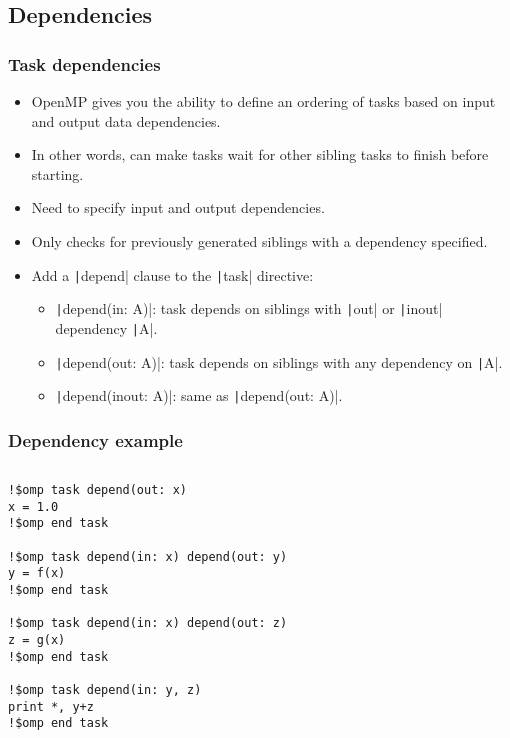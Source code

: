 \documentclass{beamer}
\begin{document}
\subsection{Dependencies}
\begin{frame}
\frametitle{Task dependencies}
\begin{itemize}
  \item OpenMP gives you the ability to define an ordering of tasks based on input and output data dependencies.
  \item In other words, can make tasks wait for other sibling tasks to finish before starting.
  \item Need to specify input and output dependencies.
  \item Only checks for previously generated siblings with a dependency specified.
  \item Add a \texttt|depend| clause to the \texttt|task| directive:
  \begin{itemize}
    \item \texttt|depend(in: A)|: task depends on siblings with \texttt|out| or \texttt|inout| dependency \texttt|A|.
    \item \texttt|depend(out: A)|: task depends on siblings with any dependency on \texttt|A|.
    \item \texttt|depend(inout: A)|: same as \texttt|depend(out: A)|.
  \end{itemize}
\end{itemize}
\end{frame}

\begin{frame}[fragile]
\frametitle{Dependency example}
\begin{columns}
\begin{column}{0.7\textwidth}
\begin{verbatim}
!$omp task depend(out: x)
x = 1.0
!$omp end task

!$omp task depend(in: x) depend(out: y)
y = f(x)
!$omp end task

!$omp task depend(in: x) depend(out: z)
z = g(x)
!$omp end task

!$omp task depend(in: y, z)
print *, y+z
!$omp end task
\end{verbatim}
\end{column}

\begin{column}{0.3\textwidth}
\end{column}
\end{columns}
\end{frame}
\end{document}
